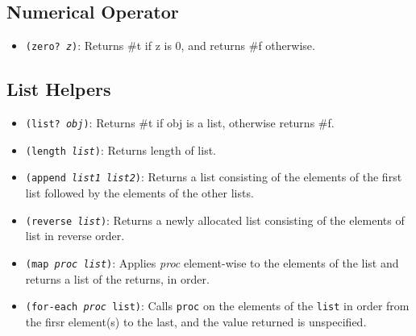 \documentclass{article}
\begin{document}
\subsection*{Numerical Operator}
\begin{itemize}
\item \texttt{(zero? \textit{z})}: Returns \#t if z is 0, and returns \#f otherwise.
\end{itemize}
\subsection*{List Helpers}
\begin{itemize}
\item \texttt{(list? \textit{obj})}: Returns \#t if obj is a list, otherwise returns \#f.
\item \texttt{(length \textit{list})}: Returns length of list.
\item \texttt{(append \textit{list1} \textit{list2})}: Returns a list consisting of the elements of the first list followed by the elements of the other lists.
\item \texttt{(reverse \textit{list})}: Returns a newly allocated list consisting of the elements of list in reverse order.
\item \texttt{(map \textit{proc} \textit{list})}: Applies \textit{proc} element-wise to the elements of the list and returns a list of the returns, in order.
\item \texttt{(for-each \textit{proc} \texttt{list})}: Calls \texttt{proc} on the elements of the \texttt{list} in order from the firsr element(s) to the last, and the value returned is unspecified.
\end{itemize}
\end{document}
